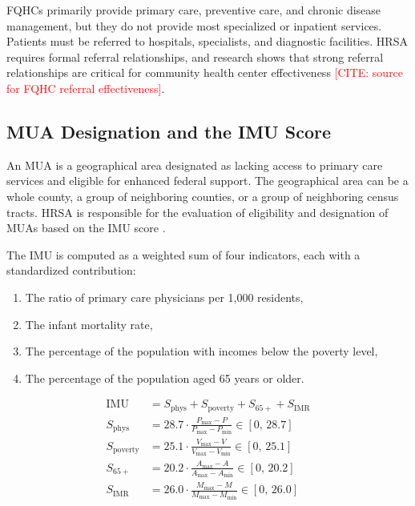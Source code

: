 \documentclass[11pt]{article}
\begin{document}
FQHCs primarily provide primary care, preventive care, and chronic disease management, but they do not 
provide most specialized or inpatient services. Patients must be referred to hospitals, specialists, 
and diagnostic facilities. HRSA requires formal referral relationships, and research shows that strong 
referral relationships are critical for community health center effectiveness \textcolor{red}{[CITE: source for FQHC referral effectiveness]}.


\subsection{MUA Designation and the IMU Score}\label{sec:imu}

An MUA is a geographical area designated as lacking access to primary care services and eligible for enhanced 
federal support. The geographical area can be a whole county, a group of neighboring counties, or a group of 
neighboring census tracts. HRSA is responsible for the evaluation of eligibility and designation of MUAs based 
on the IMU score \cite{HRSA_BPHC}.

The IMU is computed as a weighted sum of four indicators, each with a standardized contribution:
\begin{enumerate}
    \item The ratio of primary care physicians per 1,000 residents,
    \item The infant mortality rate,
    \item The percentage of the population with incomes below the poverty level,
    \item The percentage of the population aged 65 years or older.
\end{enumerate}

\begin{align}
\text{IMU} &= S_{\text{phys}} + S_{\text{poverty}} + S_{65+} + S_{\text{IMR}} \label{eq:imu} \\[6pt]
S_{\text{phys}} &= 28.7 \cdot \frac{P_{\max} - P}{P_{\max} - P_{\min}} \in [0,\,28.7] \\[4pt]
S_{\text{poverty}} &= 25.1 \cdot \frac{V_{\max} - V}{V_{\max} - V_{\min}} \in [0,\,25.1] \\[4pt]
S_{65+} &= 20.2 \cdot \frac{A_{\max} - A}{A_{\max} - A_{\min}} \in [0,\,20.2] \\[4pt]
S_{\text{IMR}} &= 26.0 \cdot \frac{M_{\max} - M}{M_{\max} - M_{\min}} \in [0,\,26.0]
\end{align}
\end{document}
